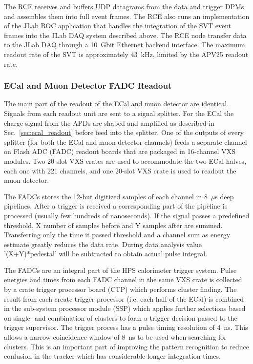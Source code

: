 The RCE receives and buffers UDP datagrams from the data and trigger DPMs and
 assembles them into full event frames. The RCE also runs an implementation of the JLab ROC application that handles the integration of the SVT event frames into the JLab DAQ 
 system described above. The RCE node transfer data to the JLab DAQ  
 through a 10~Gbit Ethernet backend interface. The maximum readout rate of the SVT is approximately 
 43~kHz, limited by the APV25 readout rate. 







\subsubsection{ECal and Muon Detector FADC Readout}
\label{sec:fadc_daq}
The main part of the readout of the ECal and muon detector are identical. Signals from each 
readout unit are sent to a signal splitter. For the ECal the charge signal from the APDs are 
shaped and amplified as described in Sec.~\ref{sec:ecal_readout} before feed into the 
splitter. One of the outputs of every splitter (for both the ECal and muon detector channels) 
feeds a separate channel on Flash ADC (FADC) readout boards that are packaged in 
16-channel VXS modules. Two 20-slot VXS crates are used to accommodate the two ECal 
halves, each one with 221 channels, and one 20-slot VXS crate is used to readout the muon 
detector. 

The FADCs stores the 12-but digitized samples of each channel in 8~$\mu$s deep pipelines. 
After a trigger is received a corresponding part of the pipeline is processed (usually few hundreds of nanoseconds). 
If the signal passes a predefined threshold, X number of samples before and Y samples after are summed. Transferring only 
the time it passed threshold and a channel sum as energy estimate greatly reduces the data rate. 
During data analysis value '(X+Y)*pedestal' will be subtracted to obtain actual pulse integral.

The FADCs are an integral part of the HPS calorimeter trigger system. Pulse energies 
and times from each FADC channel in the same VXS crate is collected by a crate trigger
 processor board (CTP) which performs cluster finding. The result from each create trigger processor (i.e. each half of 
the ECal) is combined in the sub-system processor module (SSP) which applies further selections 
based on single- and combination of clusters to form a trigger decision passed to the trigger 
supervisor. The trigger process has a pulse timing resolution of 4~ns. This allows a narrow 
coincidence window of 8~ns to be used when searching for clusters. 
This is an important part of improving 
the pattern recognition to reduce confusion in the tracker which has considerable longer 
integration times. 





